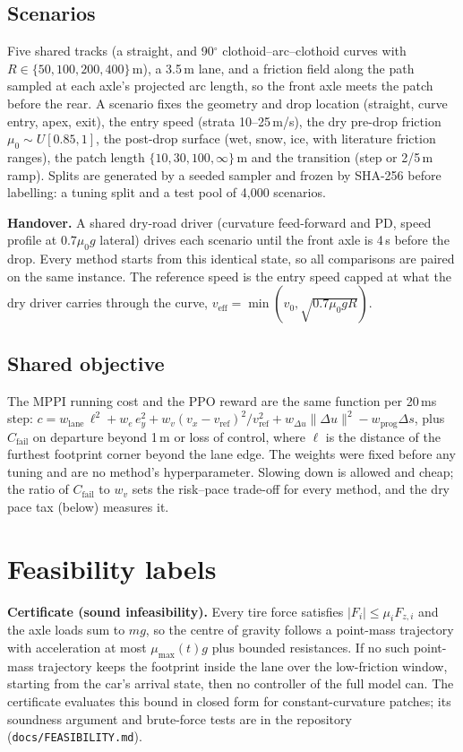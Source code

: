 \documentclass[11pt]{article}
\begin{document}
\subsection{Scenarios}
Five shared tracks (a straight, and 90$^\circ$ clothoid--arc--clothoid curves with $R\in\{50,100,200,400\}$\,m), a
3.5\,m lane, and a friction field along the path sampled at each axle's projected arc length, so the front axle meets
the patch before the rear. A scenario fixes the geometry and drop location (straight, curve entry, apex, exit), the
entry speed (strata 10--25\,m/s), the dry pre-drop friction $\mu_0\sim U[0.85,1]$, the post-drop surface (wet, snow,
ice, with literature friction ranges), the patch length $\{10,30,100,\infty\}$\,m and the transition (step or 2/5\,m
ramp). Splits are generated by a seeded sampler and frozen by SHA-256 before labelling: a tuning split and a test
pool of 4,000 scenarios.

\textbf{Handover.} A shared dry-road driver (curvature feed-forward and PD, speed profile at $0.7\mu_0 g$ lateral)
drives each scenario until the front axle is 4\,s before the drop. Every method starts from this identical state, so
all comparisons are paired on the same instance. The reference speed is the entry speed capped at what the dry
driver carries through the curve, $v_\text{eff}=\min(v_0,\sqrt{0.7\mu_0 gR})$.

\subsection{Shared objective}
The MPPI running cost and the PPO reward are the same function per 20\,ms step:
$c = w_\text{lane}\,\ell^2 + w_{e}\,e_y^2 + w_v (v_x-v_\text{ref})^2/v_\text{ref}^2 + w_{\Delta u}\|\Delta u\|^2 -
w_\text{prog}\Delta s$, plus $C_\text{fail}$ on departure beyond 1\,m or loss of control, where $\ell$ is the distance
of the furthest footprint corner beyond the lane edge. The weights were fixed before any tuning and are no method's
hyperparameter. Slowing down is allowed and cheap; the ratio of $C_\text{fail}$ to $w_v$ sets the risk--pace trade-off
for every method, and the dry pace tax (below) measures it.

\section{Feasibility labels}\label{sec:feas}
\textbf{Certificate (sound infeasibility).} Every tire force satisfies $|F_i|\le\mu_iF_{z,i}$ and the axle loads sum
to $mg$, so the centre of gravity follows a point-mass trajectory with acceleration at most $\mu_\text{max}(t)g$ plus
bounded resistances. If no such point-mass trajectory keeps the footprint inside the lane over the low-friction
window, starting from the car's arrival state, then no controller of the full model can. The certificate evaluates
this bound in closed form for constant-curvature patches; its soundness argument and brute-force tests are in the
repository (\texttt{docs/FEASIBILITY.md}).
\end{document}

